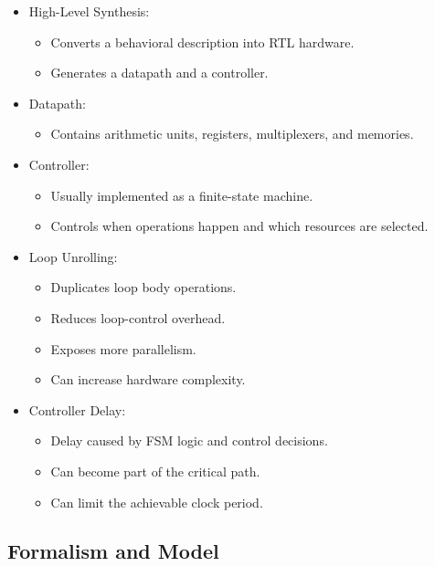 \documentclass[conference]{IEEEtran}
\begin{document}
\begin{itemize}
    \item High-Level Synthesis:
    \begin{itemize}
        \item Converts a behavioral description into RTL hardware.
        \item Generates a datapath and a controller.
    \end{itemize}

    \item Datapath:
    \begin{itemize}
        \item Contains arithmetic units, registers, multiplexers, and memories.
    \end{itemize}

    \item Controller:
    \begin{itemize}
        \item Usually implemented as a finite-state machine.
        \item Controls when operations happen and which resources are selected.
    \end{itemize}

    \item Loop Unrolling:
    \begin{itemize}
        \item Duplicates loop body operations.
        \item Reduces loop-control overhead.
        \item Exposes more parallelism.
        \item Can increase hardware complexity.
    \end{itemize}

    \item Controller Delay:
    \begin{itemize}
        \item Delay caused by FSM logic and control decisions.
        \item Can become part of the critical path.
        \item Can limit the achievable clock period.
    \end{itemize}
\end{itemize}

\subsection{Formalism and Model}
\end{document}
